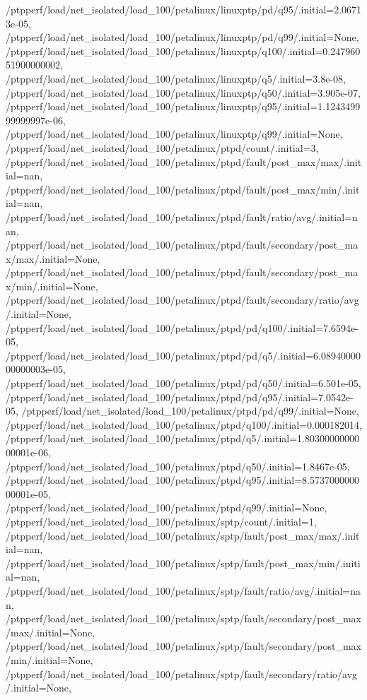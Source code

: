 {    /ptpperf/load/net_isolated/load_100/petalinux/linuxptp/pd/q95/.initial=2.06713e-05,
    /ptpperf/load/net_isolated/load_100/petalinux/linuxptp/pd/q99/.initial=None,
    /ptpperf/load/net_isolated/load_100/petalinux/linuxptp/q100/.initial=0.24796051900000002,
    /ptpperf/load/net_isolated/load_100/petalinux/linuxptp/q5/.initial=3.8e-08,
    /ptpperf/load/net_isolated/load_100/petalinux/linuxptp/q50/.initial=3.905e-07,
    /ptpperf/load/net_isolated/load_100/petalinux/linuxptp/q95/.initial=1.124349999999997e-06,
    /ptpperf/load/net_isolated/load_100/petalinux/linuxptp/q99/.initial=None,
    /ptpperf/load/net_isolated/load_100/petalinux/ptpd/count/.initial=3,
    /ptpperf/load/net_isolated/load_100/petalinux/ptpd/fault/post_max/max/.initial=nan,
    /ptpperf/load/net_isolated/load_100/petalinux/ptpd/fault/post_max/min/.initial=nan,
    /ptpperf/load/net_isolated/load_100/petalinux/ptpd/fault/ratio/avg/.initial=nan,
    /ptpperf/load/net_isolated/load_100/petalinux/ptpd/fault/secondary/post_max/max/.initial=None,
    /ptpperf/load/net_isolated/load_100/petalinux/ptpd/fault/secondary/post_max/min/.initial=None,
    /ptpperf/load/net_isolated/load_100/petalinux/ptpd/fault/secondary/ratio/avg/.initial=None,
    /ptpperf/load/net_isolated/load_100/petalinux/ptpd/pd/q100/.initial=7.6594e-05,
    /ptpperf/load/net_isolated/load_100/petalinux/ptpd/pd/q5/.initial=6.0894000000000003e-05,
    /ptpperf/load/net_isolated/load_100/petalinux/ptpd/pd/q50/.initial=6.501e-05,
    /ptpperf/load/net_isolated/load_100/petalinux/ptpd/pd/q95/.initial=7.0542e-05,
    /ptpperf/load/net_isolated/load_100/petalinux/ptpd/pd/q99/.initial=None,
    /ptpperf/load/net_isolated/load_100/petalinux/ptpd/q100/.initial=0.000182014,
    /ptpperf/load/net_isolated/load_100/petalinux/ptpd/q5/.initial=1.8030000000000001e-06,
    /ptpperf/load/net_isolated/load_100/petalinux/ptpd/q50/.initial=1.8467e-05,
    /ptpperf/load/net_isolated/load_100/petalinux/ptpd/q95/.initial=8.573700000000001e-05,
    /ptpperf/load/net_isolated/load_100/petalinux/ptpd/q99/.initial=None,
    /ptpperf/load/net_isolated/load_100/petalinux/sptp/count/.initial=1,
    /ptpperf/load/net_isolated/load_100/petalinux/sptp/fault/post_max/max/.initial=nan,
    /ptpperf/load/net_isolated/load_100/petalinux/sptp/fault/post_max/min/.initial=nan,
    /ptpperf/load/net_isolated/load_100/petalinux/sptp/fault/ratio/avg/.initial=nan,
    /ptpperf/load/net_isolated/load_100/petalinux/sptp/fault/secondary/post_max/max/.initial=None,
    /ptpperf/load/net_isolated/load_100/petalinux/sptp/fault/secondary/post_max/min/.initial=None,
    /ptpperf/load/net_isolated/load_100/petalinux/sptp/fault/secondary/ratio/avg/.initial=None,
}
